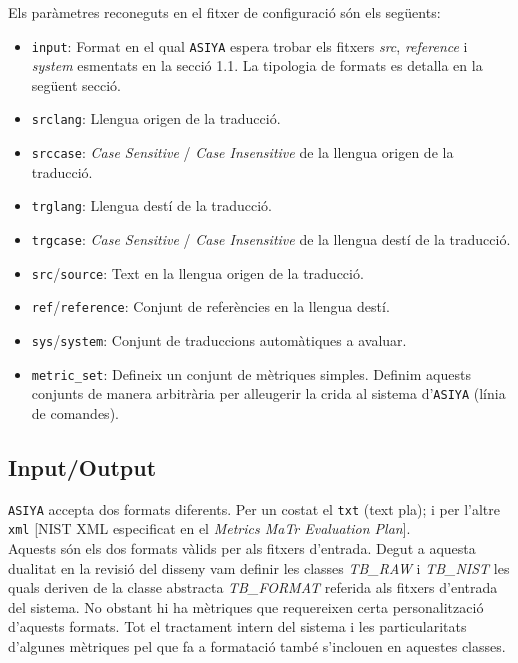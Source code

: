 \documentclass[11pt,a4paper]{article}
\begin{document}
Els paràmetres reconeguts en el fitxer de configuració són els següents:

\begin{itemize}
\item \texttt{input}: Format en el qual \texttt{ASIYA} espera trobar els fitxers \textit{src}, \textit{reference} i \textit{system} esmentats en la secció 1.1. La tipologia de formats es detalla en la següent secció.

\item \texttt{srclang}: Llengua origen de la traducció.

\item \texttt{srccase}: \textit{Case Sensitive} / \textit{Case Insensitive} de la llengua origen de la traducció.

\item \texttt{trglang}: Llengua destí de la traducció.

\item \texttt{trgcase}: \textit{Case Sensitive} / \textit{Case Insensitive} de la llengua destí de la traducció.

\item \texttt{src}/\texttt{source}: Text en la llengua origen de la traducció.

\item \texttt{ref}/\texttt{reference}: Conjunt de referències en la llengua destí.

\item \texttt{sys}/\texttt{system}: Conjunt de traduccions automàtiques a avaluar.

\item \texttt{metric\_set}: Defineix un conjunt de mètriques simples. Definim aquests conjunts de manera arbitrària per alleugerir la crida al sistema d'\texttt{ASIYA} (línia de comandes).
\end{itemize}


\subsection{Input/Output}

\texttt{ASIYA} accepta dos formats diferents. Per un costat el \texttt{txt} (text pla\cite{textfile}); i per l'altre \texttt{xml} [NIST XML especificat en el \textit{Metrics MaTr Evaluation Plan}\cite{nist_xml}].
\\

Aquests són els dos formats vàlids per als fitxers d'entrada. Degut a aquesta dualitat en la revisió del disseny vam definir les classes \textit{TB\_RAW} i \textit{TB\_NIST} les quals deriven de la classe abstracta \textit{TB\_FORMAT} referida als fitxers d'entrada del sistema. No obstant hi ha mètriques que requereixen certa personalització d'aquests formats. Tot el tractament intern del sistema i les particularitats d'algunes mètriques pel que fa a formatació també s'inclouen en aquestes classes.
\\
\end{document}
